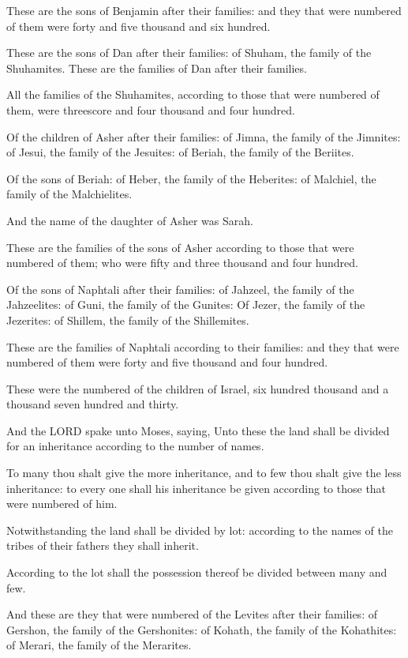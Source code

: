 \verse These are the sons of Benjamin after their families: and they
that were numbered of them were forty and five thousand and six
hundred.

\verse These are the sons of Dan after their families: of Shuham, the
family of the Shuhamites. These are the families of Dan after their
families.

\verse All the families of the Shuhamites, according to those that were
numbered of them, were threescore and four thousand and four hundred.

\verse Of the children of Asher after their families: of Jimna, the
family of the Jimnites: of Jesui, the family of the Jesuites: of
Beriah, the family of the Beriites.

\verse Of the sons of Beriah: of Heber, the family of the Heberites: of
Malchiel, the family of the Malchielites.

\verse And the name of the daughter of Asher was Sarah.

\verse These are the families of the sons of Asher according to those
that were numbered of them; who were fifty and three thousand and four
hundred.

\verse Of the sons of Naphtali after their families: of Jahzeel, the
family of the Jahzeelites: of Guni, the family of the Gunites: \verse
Of Jezer, the family of the Jezerites: of Shillem, the family of the
Shillemites.

\verse These are the families of Naphtali according to their families:
and they that were numbered of them were forty and five thousand and
four hundred.

\verse These were the numbered of the children of Israel, six hundred
thousand and a thousand seven hundred and thirty.

\verse And the LORD spake unto Moses, saying, \verse Unto these the land
shall be divided for an inheritance according to the number of names.

\verse To many thou shalt give the more inheritance, and to few thou
shalt give the less inheritance: to every one shall his inheritance be
given according to those that were numbered of him.

\verse Notwithstanding the land shall be divided by lot: according to
the names of the tribes of their fathers they shall inherit.

\verse According to the lot shall the possession thereof be divided
between many and few.

\verse And these are they that were numbered of the Levites after their
families: of Gershon, the family of the Gershonites: of Kohath, the
family of the Kohathites: of Merari, the family of the Merarites.

